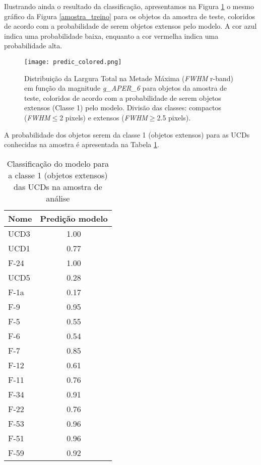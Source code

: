 Ilustrando ainda o resultado da classificação, apresentamos na Figura \ref{predic_colored} o mesmo gráfico da Figura \ref{amostra_treino} para os objetos da amostra de teste, coloridos de acordo com a probabilidade de serem objetos extensos pelo modelo. A cor azul indica uma probabilidade baixa, enquanto a cor vermelha indica uma probabilidade alta.

\begin{figure}[!ht]
    \centering
    \texttt{[image: predic\_colored.png]}
    \caption[]{Distribuição da Largura Total na Metade Máxima (\textit{FWHM} r-band) em função da magnitude \textit{g\_APER\_6} para objetos da amostra de teste, coloridos de acordo com a probabilidade de serem objetos extensos (Classe 1) pelo modelo. Divisão das classes: compactos (\textit{FWHM}$\leq$2 pixels) e extensos (\textit{FWHM}$\geq$2.5 pixels).}
    \label{predic_colored}
\end{figure}

A probabilidade dos objetos serem da classe 1 (objetos extensos) para as UCDs conhecidas na amostra é apresentada na Tabela \ref{ucds_predict}.

\begin{table}[H]
    \centering
    \caption{Classificação do modelo para a classe 1 (objetos extensos) das UCDs na amostra de análise}  
    \begin{tabular}{lc}
        \toprule
        Nome & Predição modelo \\
        \midrule
        UCD3 & 1.00 \\
        UCD1 & 0.77 \\
        F-24 & 1.00 \\
        UCD5 & 0.28 \\
        F-1a & 0.17 \\
        F-9 & 0.95 \\
        F-5 & 0.55 \\
        F-6 & 0.54 \\
        F-7 & 0.85 \\
        F-12 & 0.61 \\
        F-11 & 0.76 \\
        F-34 & 0.91 \\
        F-22 & 0.76 \\
        F-53 & 0.96 \\
        F-51 & 0.96 \\
        F-59 & 0.92 \\
        \bottomrule
    \end{tabular}
    \label{ucds_predict}
\end{table}

